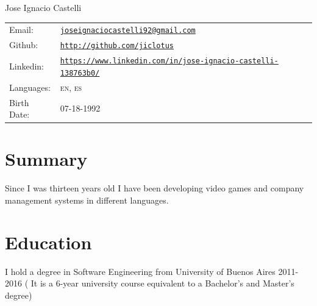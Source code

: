 \documentclass[letterpaper]{article}
\def\name{Jose Ignacio Castelli}
\newenvironment{no-indent-itemize}{
  \begin{list}{}{
    \setlength{\leftmargin}{0em}
  }
}{
  \end{list}
}
\begin{document}
{\huge \name}



\bigskip
\begin{minipage}{0.45\linewidth}
  \begin{tabular}{llll}
    
    
    Email: & \href{mailto:joseignaciocastelli92@gmail.com}{\tt joseignaciocastelli92@gmail.com} \\
     
    
    Github: &\href{http://github.com/jiclotus}{\tt http://github.com/jiclotus}\\
    
    Linkedin: &\href{https://www.linkedin.com/in/jose-ignacio-castelli-138763b0/}{\tt https://www.linkedin.com/in/jose-ignacio-castelli-138763b0/}\\
    
    Languages: & \textsc{en}, \textsc{es}\\
    Birth Date: & \textsc{07-18-1992}
    
    
  \end{tabular}
\end{minipage}


\hfill 
{}


\section*{Summary}
\begin{no-indent-itemize}
    \item Since I was thirteen years old I have been developing video games and company management systems in different languages. 
\end{no-indent-itemize}

\section*{Education}
\begin{no-indent-itemize}
  \item I hold a degree in Software Engineering from University of Buenos Aires 2011-2016 ( It is a 6-year university course equivalent to a Bachelor's and Master's degree) 
\end{no-indent-itemize}
\end{document}
